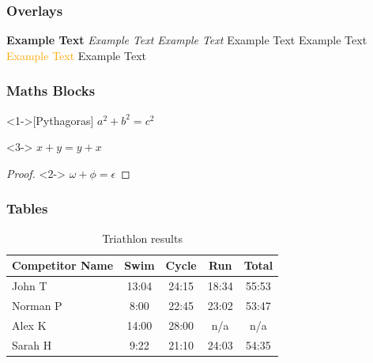 \documentclass{beamer}
\begin{document}
        \begin{frame}
          \frametitle{Overlays}
          
          
          \end{frame}

          \begin{frame}
            \textbf<2>{Example Text}
            \textit<2>{Example Text}
            \textsl<2>{Example Text}
            \textrm<2>{Example Text}
            \textsf<2>{Example Text}
            \textcolor<2>{orange}{Example Text}
            \alert<2>{Example Text}
          \end{frame}
          \begin{frame}
            \frametitle{Maths Blocks}
            \begin{theorem}<1->[Pythagoras] 
            $ a^2 + b^2 = c^2$
            \end{theorem}
            \begin{corollary}<3->
            $ x + y = y + x  $
            \end{corollary}
            \begin{proof}<2->
            $\omega +\phi = \epsilon $
            \end{proof}
            \end{frame}
\begin{frame}
\frametitle{Tables}
\begin{table}
\begin{tabular}{l | c | c | c | c }
Competitor Name & Swim & Cycle & Run & Total \\
\hline \hline
John T & 13:04 & 24:15 & 18:34 & 55:53  \\ 
Norman P & 8:00 & 22:45 & 23:02 & 53:47 \\
Alex K & 14:00 & 28:00 & n/a & n/a \\
Sarah H & 9:22 & 21:10 & 24:03 & 54:35 
\end{tabular}
\caption{Triathlon results}
\end{table}
\end{frame}
\end{document}
